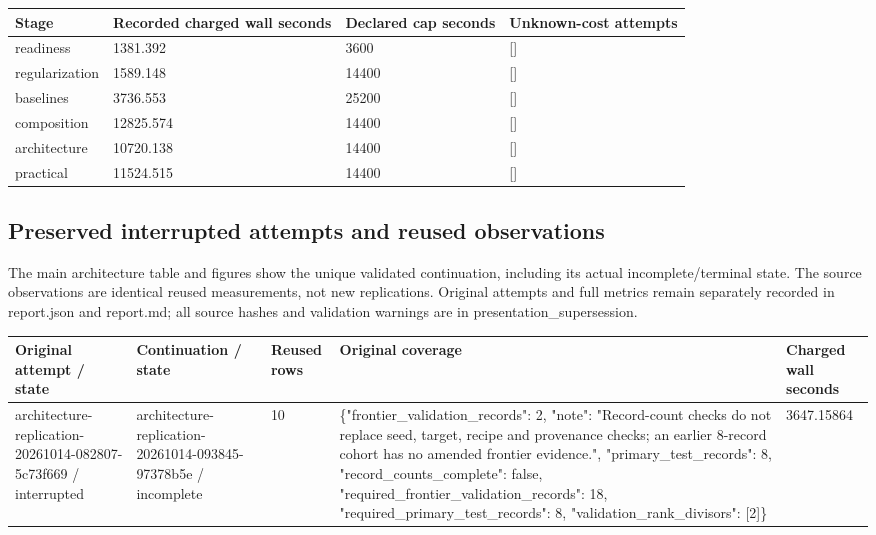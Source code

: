 \documentclass[10pt]{article}
\begin{document}
{\scriptsize\setlength{\tabcolsep}{2pt}
\begin{longtable}{p{}p{}p{}p{}}
Stage & Recorded charged wall seconds & Declared cap seconds & Unknown-cost attempts \\
\hline\endhead
readiness & 1381.392 & 3600 & [] \\
regularization & 1589.148 & 14400 & [] \\
baselines & 3736.553 & 25200 & [] \\
composition & 12825.574 & 14400 & [] \\
architecture & 10720.138 & 14400 & [] \\
practical & 11524.515 & 14400 & [] \\
\end{longtable}}

\subsection{Preserved interrupted attempts and reused observations}

The main architecture table and figures show the unique validated continuation, including its actual incomplete/terminal state. The source observations are identical reused measurements, not new replications. Original attempts and full metrics remain separately recorded in report.json and report.md; all source hashes and validation warnings are in presentation\_supersession.

{\scriptsize\setlength{\tabcolsep}{2pt}
\begin{longtable}{p{}p{}p{}p{}p{}}
Original attempt / state & Continuation / state & Reused rows & Original coverage & Charged wall seconds \\
\hline\endhead
architecture-replication-20261014-082807-5c73f669 / interrupted & architecture-replication-20261014-093845-97378b5e / incomplete & 10 & \{"frontier\_validation\_records": 2, "note": "Record-count checks do not replace seed, target, recipe and provenance checks; an earlier 8-record cohort has no amended frontier evidence.", "primary\_test\_records": 8, "record\_counts\_complete": false, "required\_frontier\_validation\_records": 18, "required\_primary\_test\_records": 8, "validation\_rank\_divisors": [2]\} & 3647.15864 \\
\end{longtable}}
\end{document}
